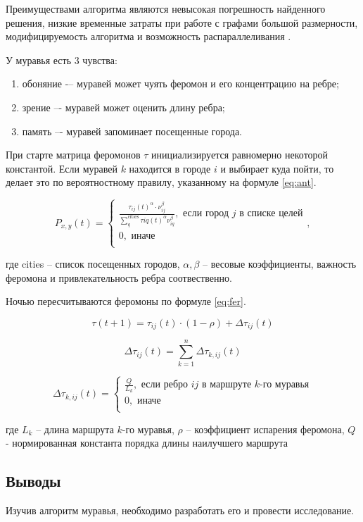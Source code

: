 Преимуществами алгоритма являются невысокая погрешность найденного решения, низкие временные затраты при работе
с графами большой размерности, модифицируемость алгоритма и возможность распараллеливания \cite{ant}.

У муравья есть 3 чувства:

\begin{enumerate}
    \item обоняние -– муравей может чуять феромон и его концентрацию на ребре;
    \item зрение –- муравей может оценить длину ребра;
    \item память –- муравей запоминает посещенные города.
\end{enumerate}

При старте матрица феромонов $\tau$ инициализируется равномерно некоторой константой.
Если муравей $k$ находится в городе $i$ и выбирает куда пойти, то делает это по вероятностному правилу, указанному
на формуле \ref{eq:ant}.

\begin{equation}\label{eq:ant}
    P_{x,y}(t) =
    \begin{cases}
        \frac{\tau_{ij}(t)^\alpha \cdot \nu_{ij}^\beta}{\sum_q^\text{cities} \tau{iq}(t)^\alpha \nu_{iq}^\beta},
        \text{ если город } j \text{ в списке целей} \\
        0, \text{ иначе} \\
    \end{cases},
\end{equation}

где cities -- список посещенных городов, $\alpha, \beta$ -- весовые коэффициенты,
важность феромона и привлекательность ребра соотвественно.

Ночью пересчитываются феромоны по формуле \ref{eq:fer}.

\begin{equation}\label{eq:fer}
    \tau(t+1) = \tau_{ij}(t) \cdot (1 - \rho) + \Delta \tau_{ij}(t)
\end{equation}

\begin{equation}
    \Delta \tau_{ij}(t) = \sum_{k=1}^n \Delta \tau_{k,ij}(t)
\end{equation}

\begin{equation}
    \Delta \tau_{k,ij}(t) =
    \begin{cases}
        \frac{Q}{L_k}, \text{ если ребро } ij \text{ в маршруте } k \text{-го муравья} \\
        0, \text{ иначе} \\
    \end{cases}
\end{equation}

где $L_k$ -- длина маршрута $k$-го муравья, $\rho$ -- коэффициент испарения феромона, $Q$ - нормированная константа
порядка длины наилучшего маршрута

\subsection{Выводы}

Изучив алгоритм муравья, необходимо разработать его и провести исследование.
